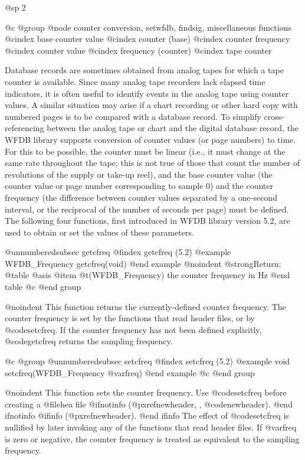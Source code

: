 {{{{{{{{@sp 2

@c @group
@node     counter conversion, setwfdb, findsig, miscellaneous functions
@cindex base counter value
@cindex counter (base)
@cindex counter frequency
@cindex counter value
@cindex frequency (counter)
@cindex tape counter

Database records are sometimes obtained from analog tapes for which a
tape counter is available.  Since many analog tape recorders lack
elapsed time indicators, it is often useful to identify events in the
analog tape using counter values.  A similar situation may arise if a
chart recording or other hard copy with numbered pages is to be compared
with a database record.  To simplify cross-referencing between the
analog tape or chart and the digital database record, the WFDB library
supports conversion of counter values (or page numbers) to time.  For this
to be possible, the counter must be linear (i.e., it must change at the
same rate throughout the tape; this is not true of those that count the
number of revolutions of the supply or take-up reel), and the base
counter value (the counter value or page number corresponding to sample
0) and the counter frequency (the difference between counter values
separated by a one-second interval, or the reciprocal of the number of
seconds per page) must be defined.  The following four functions,
first introduced in WFDB library version 5.2, are used to obtain or set
the values of these parameters.

@unnumberedsubsec getcfreq
@findex getcfreq (5.2)
@example
WFDB_Frequency getcfreq(void)
@end example
@noindent
@strong{Return:}
@table @asis
@item @t{(WFDB_Frequency)}
the counter frequency in Hz
@end table
@c @end group

@noindent
This function returns the currently-defined counter frequency.  The
counter frequency is set by the functions that read header
files, or by @code{setcfreq}.  If the counter frequency has not been
defined explicitly, @code{getcfreq} returns the sampling frequency.

@c @group
@unnumberedsubsec setcfreq
@findex setcfreq (5.2)
@example
void setcfreq(WFDB_Frequency @var{freq})
@end example
@c @end group

@noindent
This function sets the counter frequency.  Use @code{setcfreq}
before creating a @file{hea} file
@ifnotinfo
(@pxref{newheader, , @code{newheader}}).
@end ifnotinfo
@ifinfo
(@pxref{newheader}).
@end ifinfo
The effect of @code{setcfreq} is nullified by later invoking any of the
functions that read header files.  If @var{freq} is zero or
negative, the counter frequency is treated as equivalent to the sampling
frequency.

}}}}}}}}
